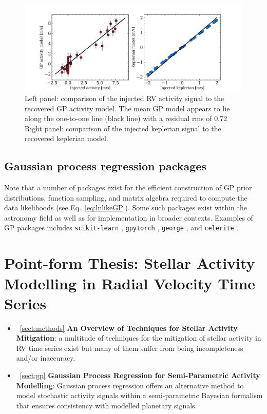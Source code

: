 \begin{figure}
  \centering
  \includegraphics[width=\hsize]{figures/RVcomparison.png}
  \caption[Comparison of injected to recovered RV signals.]
          {Left panel: comparison of the injected RV activity signal to the recovered GP activity model.
            The mean GP model appears to lie along the one-to-one line (black line) with a residual rms
            of 0.72  Right panel:
          comparison of the injected keplerian signal to the recovered keplerian model. }
  \label{fig:RVcomp}
\end{figure}


\subsection{Gaussian process regression packages}
Note that a number of packages exist for the efficient construction of GP prior distributions, function
sampling, and matrix algebra required to compute the data likelihoods (see Eq.~\ref{eq:lnlikeGP}).
Some such packages exist within the astronomy field as well as for implementation in broader contexts.
Examples of GP packages includes \texttt{scikit-learn} \citep{sklearn},
\texttt{gpytorch} \citep{gardner18,wang19},
\texttt{george} \citep{ambikasaran14,foremanmackey15b}, and
\texttt{celerite} \citep{foremanmackey17}.


\section{Point-form Thesis: Stellar Activity Modelling in Radial Velocity
  Time Series}
\begin{itemize}
\renewcommand\labelitemi{--}
\item~\ref{sect:methods} \textbf{An Overview of Techniques for Stellar Activity
  Mitigation}: a multitude of techniques for the mitigation of stellar activity in RV time series exist
  but many of them suffer from being incompleteness and/or inaccuracy.
\item~\ref{sect:gp} \textbf{Gaussian Process Regression for Semi-Parametric
  Activity Modelling}: Gaussian process regression offers an alternative method to model
  stochastic activity signals within a semi-parametric Bayesian formalism that ensures consistency
  with modelled planetary signals.
\end{itemize}
